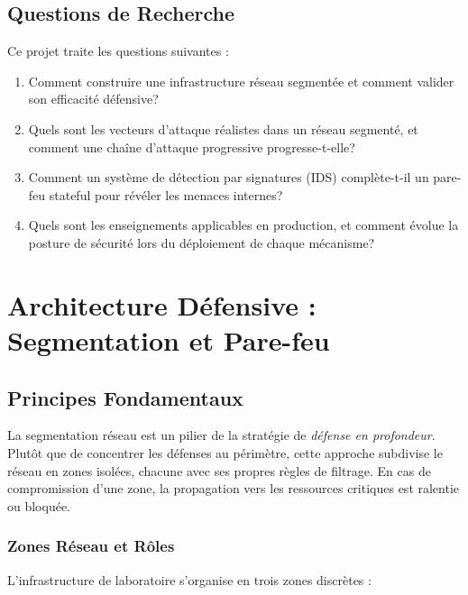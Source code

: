 \documentclass[12pt,a4paper,openany]{report}
\begin{document}
	\section{Questions de Recherche}
	
	Ce projet traite les questions suivantes :
	
	\begin{enumerate}[leftmargin=*]
		\item Comment construire une infrastructure réseau segmentée et comment valider son efficacité défensive?
		\item Quels sont les vecteurs d'attaque réalistes dans un réseau segmenté, et comment une chaîne d'attaque progressive progresse-t-elle?
		\item Comment un système de détection par signatures (IDS) complète-t-il un pare-feu stateful pour révéler les menaces internes?
		\item Quels sont les enseignements applicables en production, et comment évolue la posture de sécurité lors du déploiement de chaque mécanisme?
	\end{enumerate}
	
	\chapter{Architecture Défensive : Segmentation et Pare-feu}

\section{Principes Fondamentaux}

La segmentation réseau est un pilier de la stratégie de \textit{défense en profondeur}. Plutôt que de concentrer les défenses au périmètre, cette approche subdivise le réseau en zones isolées, chacune avec ses propres règles de filtrage. En cas de compromission d'une zone, la propagation vers les ressources critiques est ralentie ou bloquée.

\subsection{Zones Réseau et Rôles}

L'infrastructure de laboratoire s'organise en trois zones discrètes :
\end{document}
